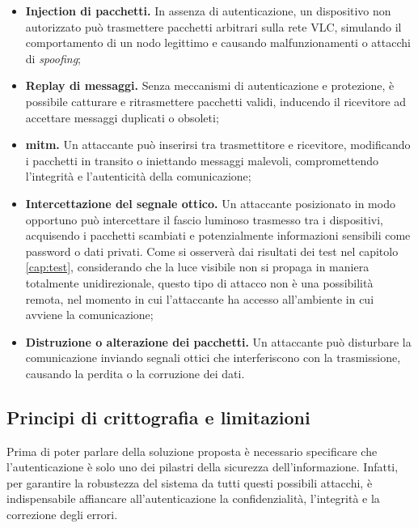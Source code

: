 \begin{itemize}
    \item \textbf{Injection di pacchetti.} In assenza di autenticazione, un dispositivo non autorizzato può trasmettere pacchetti arbitrari sulla rete VLC, simulando il comportamento di un nodo legittimo e causando malfunzionamenti o attacchi di \textit{spoofing};
    \item \textbf{Replay di messaggi.} Senza meccanismi di autenticazione e protezione, è possibile catturare e ritrasmettere pacchetti validi, inducendo il ricevitore ad accettare messaggi duplicati o obsoleti;
    \item \textbf{\gls{mitm}\glsfirstoccur.} Un attaccante può inserirsi tra trasmettitore e ricevitore, modificando i pacchetti in transito o iniettando messaggi malevoli, compromettendo l'integrità e l'autenticità della comunicazione;
    \item \textbf{Intercettazione del segnale ottico.} Un attaccante posizionato in modo opportuno può intercettare il fascio luminoso trasmesso tra i dispositivi, acquisendo i pacchetti scambiati e potenzialmente informazioni sensibili come password o dati privati. Come si osserverà dai risultati dei test nel capitolo \ref{cap:test}, considerando che la luce visibile non si propaga in maniera totalmente unidirezionale, questo tipo di attacco non è una possibilità remota, nel momento in cui l'attaccante ha accesso all'ambiente in cui avviene la comunicazione;
    \item \textbf{Distruzione o alterazione dei pacchetti.} Un attaccante può disturbare la comunicazione inviando segnali ottici che interferiscono con la trasmissione, causando la perdita o la corruzione dei dati.
\end{itemize}

\subsection{Principi di crittografia e limitazioni}
Prima di poter parlare della soluzione proposta è necessario specificare che l'autenticazione è solo uno dei pilastri della sicurezza dell'informazione. Infatti, per garantire la robustezza del sistema da tutti questi possibili attacchi, è indispensabile affiancare all'autenticazione la confidenzialità, l'integrità e la correzione degli errori.

